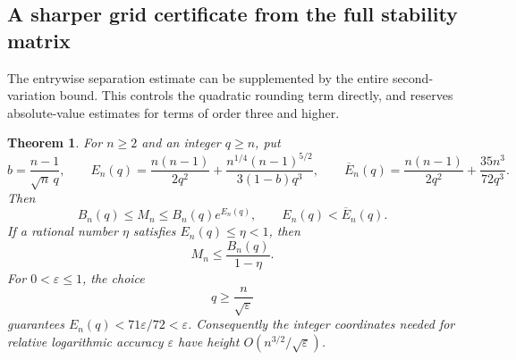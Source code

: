 \documentclass[11pt]{article}
\newtheorem{theorem}{Theorem}[section]
\theoremstyle{remark}
\numberwithin{equation}{section}
\begin{document}
\subsection{A sharper grid certificate from the full stability matrix}

The entrywise separation estimate can be supplemented by the entire
second-variation bound.  This controls the quadratic rounding term directly,
and reserves absolute-value estimates for terms of order three and higher.

\begin{theorem}\label{thm:grid-sharper}
For $n\ge2$ and an integer $q\ge n$, put
\[
 b=\frac{n-1}{\sqrt n\,q},\qquad
 E_n(q)=\frac{n(n-1)}{2q^2}
       +\frac{n^{1/4}(n-1)^{5/2}}{3(1-b)q^3},\qquad
 \overline E_n(q)=\frac{n(n-1)}{2q^2}+\frac{35n^3}{72q^3}.
\]
Then
\[
 B_n(q)\le M_n\le B_n(q)e^{E_n(q)},\qquad
 E_n(q)<\overline E_n(q).
\]
If a rational number $\eta$ satisfies $E_n(q)\le\eta<1$, then
\[
 M_n\le\frac{B_n(q)}{1-\eta}.
\]
For $0<\varepsilon\le1$, the choice
\[
 q\ge\frac n{\sqrt\varepsilon}
\]
guarantees $E_n(q)<71\varepsilon/72<\varepsilon$.  Consequently the
integer coordinates needed for relative logarithmic accuracy $\varepsilon$
have height $O(n^{3/2}/\sqrt\varepsilon)$.
\end{theorem}
\end{document}
